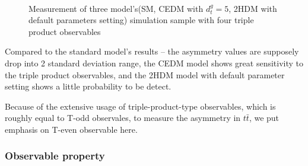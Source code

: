 		\FloatBarrier
		\begin{figure}[H]
		\centering
		    \\
		\caption{Measurement of three model's(SM, CEDM with $d_t^g=5$, 2HDM with default parameters setting) simulation sample with four triple product observables}
		\label{Obs:fig:TP_3model}
		\end{figure}
		\FloatBarrier

		Compared to the standard model's results -- the asymmetry values are supposely drop into 2 standard deviation range, the CEDM model shows great sensitivity to the triple product observables, and the 2HDM model with default parameter setting shows a little probability to be detect.

		Because of the extensive usage of triple-product-type observables, which is roughly equal to T-odd observales, to measure the asymmetry in $t\bar{t}$, we put emphasis on T-even observable here.







		\subsubsection{Observable property}
		\label{sssec:AcpObs_property}


\FloatBarrier

